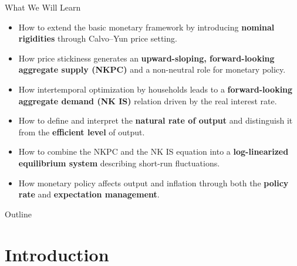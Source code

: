 \documentclass[11pt,aspectratio=169]{beamer}
\begin{document}
\begin{frame}{What We Will Learn}
\small

\begin{itemize}
  \item How to extend the basic monetary framework by introducing 
        \textbf{nominal rigidities} through Calvo–Yun price setting.

  \item How price stickiness generates an \textbf{upward-sloping, 
        forward-looking aggregate supply (NKPC)} and a non-neutral role for monetary policy.

  \item How intertemporal optimization by households leads to a 
        \textbf{forward-looking aggregate demand (NK IS)} relation driven by the real interest rate.

  \item How to define and interpret the \textbf{natural rate of output} 
        and distinguish it from the \textbf{efficient level} of output.

  \item How to combine the NKPC and the NK IS equation into a 
        \textbf{log-linearized equilibrium system} describing short-run fluctuations.

  \item How monetary policy affects output and inflation through 
        both the \textbf{policy rate} and \textbf{expectation management}.
\end{itemize}

\end{frame}

\begin{frame}{Outline}
\tableofcontents
\end{frame}

\section{Introduction}
\end{document}
